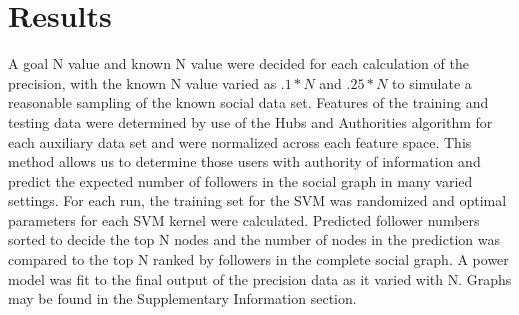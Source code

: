 \documentclass{sig-alternate-10pt}
\begin{document}
\section{Results}
A goal N value and known N value were decided for each calculation of the precision, with the known N value varied as $.1*N$ and $.25*N$ to simulate a reasonable sampling of the known social data set.
Features of the training and testing data were determined by use of the Hubs and Authorities algorithm for each auxiliary data set and were normalized across each feature space.
This method allows us to determine those users with authority of information and predict the expected number of followers in the social graph in many varied settings.
For each run, the training set for the SVM was randomized and optimal parameters for each SVM kernel were calculated.
Predicted follower numbers sorted to decide the top N nodes and the number of nodes in the prediction was compared to the top N ranked by followers in the complete social graph.
A power model was fit to the final output of the precision data as it varied with N.
Graphs may be found in the Supplementary Information section.
\end{document}
